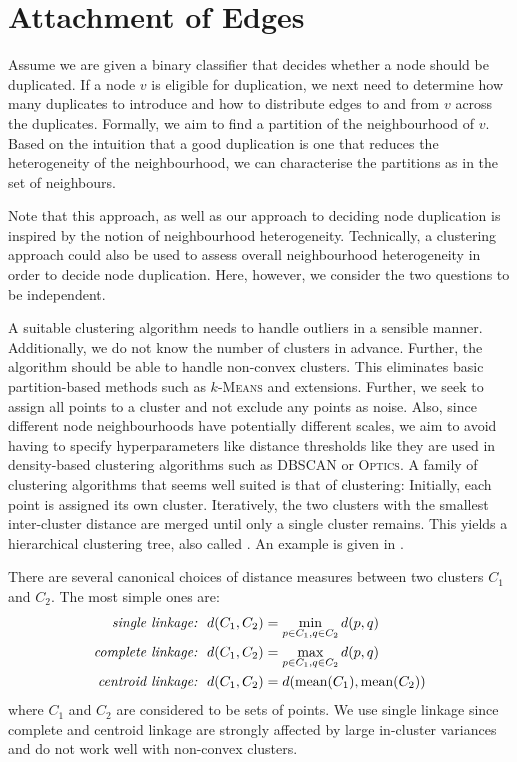 \documentclass[
	fontsize=10pt, %
	twoside=true, %
	secnumdepth=1, %
  toc=indentunnumbered %
]{kaobook}
\begin{document}
\section{Attachment of Edges}
\label{sec:edge-attachment}


Assume we are given a binary classifier that decides whether a node should be
duplicated. If a node $v$ is eligible for duplication, we next need to determine
how many duplicates to introduce and how to distribute edges to and from $v$
across the duplicates. Formally, we aim to find a partition of the neighbourhood
of $v$. Based on the intuition that a good duplication is one that reduces the
heterogeneity of the neighbourhood, we can characterise the partitions as
 in the set of neighbours.

Note that this approach, as well as our approach to deciding node duplication is
inspired by the notion of neighbourhood heterogeneity. Technically, a clustering
approach could also be used to assess overall neighbourhood heterogeneity in
order to decide node duplication. Here, however, we consider the two questions
to be independent. 



A suitable clustering algorithm needs to handle outliers in a sensible manner.
Additionally, we do not know the number of clusters in advance. Further, the
algorithm should be able to handle non-convex clusters. This eliminates basic
partition-based methods such as $k$-\textsc{Means} and extensions.
%
Further, we seek to assign all points to a cluster and not exclude any points as
noise. Also, since different node neighbourhoods have potentially different
scales, we aim to avoid having to specify hyperparameters like distance
thresholds like they are used in density-based clustering algorithms such as
\textsc{DBSCAN} or \textsc{Optics}.
%
A family of clustering algorithms that seems well suited is that of
 clustering: Initially, each point is assigned its own
cluster. Iteratively, the two clusters with the smallest inter-cluster distance
are merged until only a single cluster remains. This yields a hierarchical
clustering tree, also called . An example is given in
.

There are several canonical choices of distance measures between two clusters $C_1$ and
$C_2$. The most simple ones are:
\begin{align*}
  \text{{\textit{{single linkage:}}}} &~~ d(C_1, C_2) = \min_{p \in C_1, q \in C_2} d(p,q) \\
  \text{{\textit{{complete linkage:}}}} &~~ d(C_1, C_2) = \max_{p \in C_1, q \in C_2} d(p,q) \\
  \text{{\textit{{centroid linkage:}}}} &~~ d(C_1, C_2) = d(\text{mean}(C_1),\text{mean}(C_2))
\end{align*}
where $C_1$ and $C_2$ are considered to be sets of points. We use single linkage
since complete and centroid linkage are strongly affected by large in-cluster
variances and do not work well with non-convex clusters.
\end{document}
